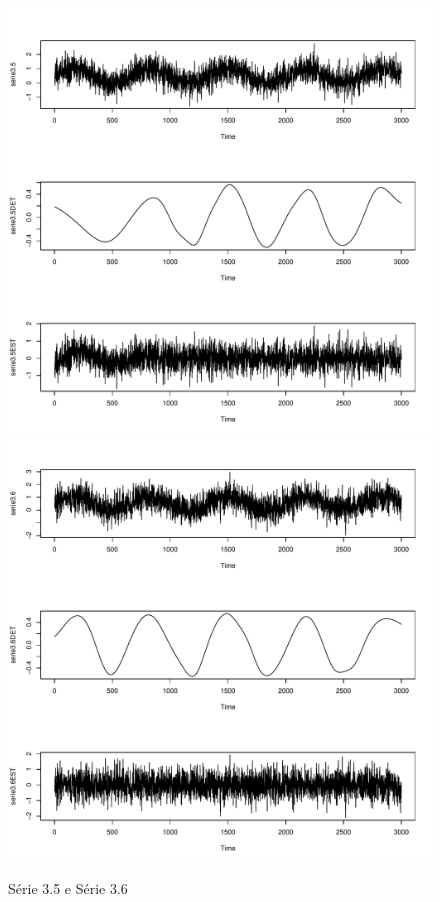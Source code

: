 \graphicspath{{imagens/}}
\begin{figure}[H]
\begin{center}
  \includegraphics[scale=0.43]{serie3_5.pdf} \quad
  \includegraphics[scale=0.43]{serie3_6.pdf}
  \caption{Série 3.5 e Série 3.6}

\end{center}
\end{figure}

